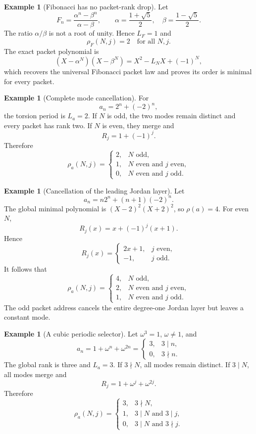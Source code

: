 \documentclass[11pt]{article}
\theoremstyle{definition}\newtheorem{definition}[theorem]{Definition}\newtheorem{example}[theorem]{Example}\newtheorem{construction}[theorem]{Construction}\newtheorem{algorithm}[theorem]{Algorithm}\newtheorem{conjecture}[theorem]{Conjecture}\newtheorem{problem}[theorem]{Problem}
\theoremstyle{remark}\newtheorem{remark}[theorem]{Remark}\newtheorem{boundary}[theorem]{Boundary}\newtheorem{certificate}[theorem]{Computational Certificate}\newtheorem{classical}[theorem]{Classical Input}\newtheorem{principle}[theorem]{Structural Principle}
\begin{document}
\begin{example}[Fibonacci has no packet-rank drop]
Let
\[
 F_n=\frac{\alpha^n-\beta^n}{\alpha-\beta},
 \qquad
 \alpha=\frac{1+\sqrt5}{2},
 \quad
 \beta=\frac{1-\sqrt5}{2}.
\]
The ratio $\alpha/\beta$ is not a root of unity.  Hence $L_F=1$ and
\[
 \boxed{\rho_F(N,j)=2\quad\text{for all }N,j.}
\]
The exact packet polynomial is
\[
 (X-\alpha^N)(X-\beta^N)
 =X^2-L_NX+(-1)^N,
\]
which recovers the universal Fibonacci packet law and proves its order is minimal for every packet.
\end{example}

\begin{example}[Complete mode cancellation]
For
\[
 a_n=2^n+(-2)^n,
\]
the torsion period is $L_a=2$.  If $N$ is odd, the two modes remain distinct and every packet has rank two.  If $N$ is even, they merge and
\[
 R_j=1+(-1)^j.
\]
Therefore
\[
 \boxed{
 \rho_a(N,j)=
 \begin{cases}
 2,&N\text{ odd},\\
 1,&N\text{ even and }j\text{ even},\\
 0,&N\text{ even and }j\text{ odd}.
 \end{cases}}
\]
\end{example}

\begin{example}[Cancellation of the leading Jordan layer]
Let
\[
 a_n=n2^n+(n+1)(-2)^n.
\]
The global minimal polynomial is $(X-2)^2(X+2)^2$, so $\rho(a)=4$.  For even $N$,
\[
 R_j(x)=x+(-1)^j(x+1).
\]
Hence
\[
 R_j(x)=
 \begin{cases}
 2x+1,&j\text{ even},\\
 -1,&j\text{ odd}.
 \end{cases}
\]
It follows that
\[
 \boxed{
 \rho_a(N,j)=
 \begin{cases}
 4,&N\text{ odd},\\
 2,&N\text{ even and }j\text{ even},\\
 1,&N\text{ even and }j\text{ odd}.
 \end{cases}}
\]
The odd packet address cancels the entire degree-one Jordan layer but leaves a constant mode.
\end{example}

\begin{example}[A cubic periodic selector]
Let $\omega^3=1$, $\omega\neq1$, and
\[
 a_n=1+\omega^n+\omega^{2n}
 =\begin{cases}3,&3\mid n,\\0,&3\nmid n.\end{cases}
\]
The global rank is three and $L_a=3$.  If $3\nmid N$, all modes remain distinct.  If $3\mid N$, all modes merge and
\[
 R_j=1+\omega^j+\omega^{2j}.
\]
Therefore
\[
 \boxed{
 \rho_a(N,j)=
 \begin{cases}
 3,&3\nmid N,\\
 1,&3\mid N\text{ and }3\mid j,\\
 0,&3\mid N\text{ and }3\nmid j.
 \end{cases}}
\]
\end{example}
\end{document}
